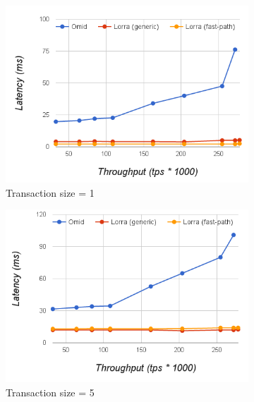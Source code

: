 \begin{figure}[t]
  \centering
  \begin{subfigure}[t]{0.33\textwidth}
	\includegraphics[width=\textwidth]{figs/thpt-latency-1.png}
	\caption[]{Transaction size = 1}
         \label{fig:tl-1}
  \end{subfigure}
  \begin{subfigure}[t]{0.33\textwidth}
	\includegraphics[width=\textwidth]{figs/thpt-latency-5.png}
	\caption[]{Transaction size = 5}
    \label{fig:tl-5}
  \end{subfigure}
    \begin{subfigure}[t]{0.33\textwidth}

\end{subfigure}
\end{figure}
